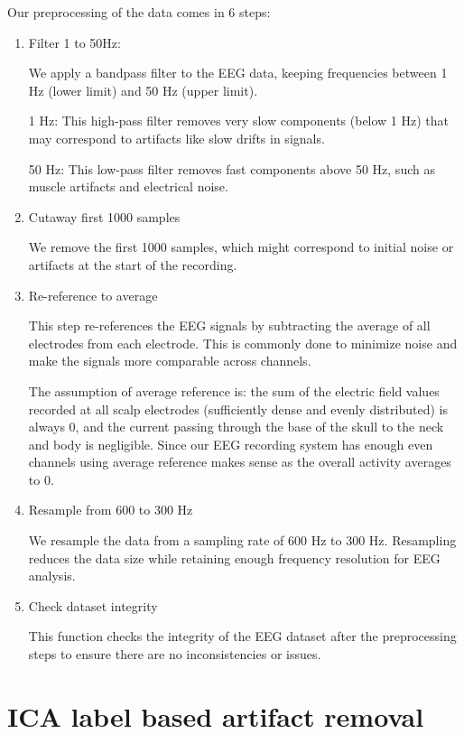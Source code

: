\documentclass[12pt,a4paper,titlepage,openany]{report}
\begin{document}
Our preprocessing of the data comes in 6 steps:
\begin{enumerate}
    \item Filter 1 to 50Hz:
    
    We apply a bandpass filter to the EEG data, keeping frequencies between 1 Hz (lower limit) and 50 Hz (upper limit).

    1 Hz: This high-pass filter removes very slow components (below 1 Hz) that may correspond to artifacts like slow drifts in signals.

    50 Hz: This low-pass filter removes fast components above 50 Hz, such as muscle artifacts and electrical noise.

    \item Cutaway first 1000 samples

    We remove the first 1000 samples, which might correspond to initial noise or artifacts at the start of the recording. 

    \item Re-reference to average

    This step re-references the EEG signals by subtracting the average of all electrodes from each electrode. This is commonly done to minimize noise and make the signals more comparable across channels.

    The assumption of average reference is: the sum of the electric field values recorded at all scalp electrodes (sufficiently dense and evenly distributed) is always 0, and the current passing through the base of the skull to the neck and body is negligible. 
    Since our EEG recording system has enough even channels using average reference makes sense as the overall activity averages to 0.

    \item Resample from 600 to 300 Hz

    We resample the data from a sampling rate of 600 Hz to 300 Hz. Resampling reduces the data size while retaining enough frequency resolution for EEG analysis.

    \item Check dataset integrity

    This function checks the integrity of the EEG dataset after the preprocessing steps to ensure there are no inconsistencies or issues.

\end{enumerate}

\section{ICA label based artifact removal}
\end{document}
